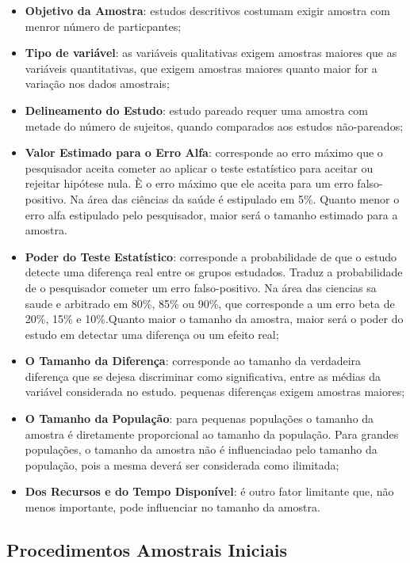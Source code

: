 \begin{itemize}
\item \textbf{Objetivo da Amostra}: estudos descritivos costumam exigir amostra com menror número de particpantes;
\item \textbf{Tipo de variável}: as variáveis qualitativas exigem amostras maiores que as variáveis quantitativas, que exigem amostras maiores quanto maior for a variação nos dados amostrais; 
\item \textbf{Delineamento do Estudo}: estudo pareado requer uma amostra com metade do número de sujeitos, quando comparados aos estudos não-pareados;
\item \textbf{Valor Estimado para o Erro Alfa}: corresponde ao erro máximo que o pesqui\-sador aceita cometer ao aplicar o teste estatístico para aceitar ou rejeitar hipótese nula. È o erro máximo que ele aceita para um erro falso-positivo. Na área das ciências da saúde é estipulado em 5\%. Quanto menor o erro alfa estipulado pelo pesquisador, maior será o tamanho estimado para a amostra. 
\item \textbf{Poder do Teste Estatístico}: corresponde a probabilidade de que o estudo detecte uma diferença real entre os grupos estudados. Traduz a probabilidade de o pesquisador cometer um erro falso-positivo. Na área das ciencias sa saude e arbitrado em 80\%, 85\% ou 90\%, que corresponde a um erro beta de 20\%, 15\% e 10\%.Quanto maior o tamanho da amostra, maior será o poder do estudo em detectar uma diferença ou um efeito real;
\item \textbf{O Tamanho da Diferença}: corresponde ao tamanho da verdadeira diferença que se dejesa discriminar como significativa, entre as médias da variável considerada no estudo. pequenas diferenças exigem amostras maiores;
\item \textbf{O Tamanho da População}: para pequenas populações o tamanho da amostra é diretamente proporcional ao tamanho da população. Para grandes populações, o tamanho da amostra não é influenciadao pelo tamanho da população, pois a mesma deverá ser considerada como ilimitada;
\item\textbf{ Dos Recursos e do Tempo Disponível}: é outro fator limitante que, não menos importante, pode influenciar no tamanho da amostra.
\end{itemize}


\subsection{Procedimentos Amostrais Iniciais}

